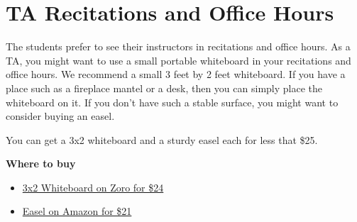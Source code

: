 \chapter{TA Recitations and Office Hours}

\begin{gram}

The students prefer to see their instructors in recitations and office
hours. As a TA, you might want to use a small portable whiteboard in
your recitations and office hours.  We recommend a small 3 feet by 2
feet whiteboard.  If you have a place such as a fireplace mantel or a
desk, then you can simply place the whiteboard on it.  If you don't
have such a stable surface, you might want to consider buying an
easel.

You can get a 3x2 whiteboard and a sturdy easel each for less that \$25.  

\textbf{Where to buy}
\begin{itemize}
\item

\href{https://www.zoro.com/zoro-select-dry-erase-board-36-w-silver-1nup9/i/G1291367/}{3x2
  Whiteboard on Zoro for \$24}

\item 
\href{https://www.amazon.com/Reinforced-Aluminum-Adjustable-Table-Top-Displaying/dp/B076X3WZHB/ref=sr_1_1_sspa?dchild=1&keywords=easel&qid=1597681145&s=office-products&sr=1-1-spons&psc=1&spLa=ZW5jcnlwdGVkUXVhbGlmaWVyPUExS1NMVkxEU1JZMVBHJmVuY3J5cHRlZElkPUEwMzQ3ODQwM1FYWDJCUFE0UzVMUSZlbmNyeXB0ZWRBZElkPUEwMzU2NjAyM0hVSEtONUpEOE4yMiZ3aWRnZXROYW1lPXNwX2F0ZiZhY3Rpb249Y2xpY2tSZWRpcmVjdCZkb05vdExvZ0NsaWNrPXRydWU=}
{Easel on Amazon for \$21}

\end{itemize}

\end{gram}
